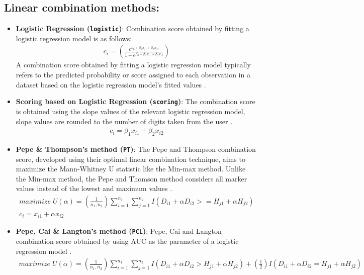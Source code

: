 \documentclass[10pt]{article}
\begin{document}
\subsection{Linear combination methods:}
\begin{itemize}
  \item \textbf{Logistic Regression (\texttt{logistic})}: Combination score obtained by fitting a logistic regression model is as follows:
    \begin{gather*} 
    c_i = \left(\frac{e^ {\beta_0 + \beta_1 x_{i1} + \beta_2 x_{i2}}}{1 + e^{\beta_0 + \beta_1 x_{i1} + \beta_2 x_{i2}}}\right)
    \end{gather*}
A combination score obtained by fitting a logistic regression model typically refers to the predicted probability or score assigned to each observation in a dataset based on the logistic regression model's fitted values \citep{walker1967estimation}.
  \item \textbf{Scoring based on Logistic Regression (\texttt{scoring})}: The combination score is obtained using the slope values of the relevant logistic regression model, slope values are rounded to the number of digits taken from the user \citep{leon2006bedside}.
    \begin{gather*} 
    c_i = \beta_1 x_{i1} + \beta_2 x_{i2}
    \end{gather*}
      \item \textbf{Pepe \& Thompson's method (\texttt{PT})}: The Pepe and Thompson combination score, developed using their optimal linear combination technique, aims to maximize the Mann-Whitney U statistic like the Min-max method. Unlike the Min-max method, the Pepe and Thomson method considers all marker values instead of the lowest and maximum values \citep{pepe2000combining}.
    \begin{gather*} 
    maximize\; U(\alpha) = \left(\frac{1}{n_1,n_2}\right) {\sum_{i=1}^{n_1} {\sum_{j=1}^{n_2}}I(D_{i1} + \alpha D_{i2} >= H_{j1} + \alpha H_{j2})} \\
    c_i = x_{i1} + \alpha x_{i2}
    \end{gather*}
    \item \textbf{Pepe, Cai \& Langton's method (\texttt{PCL})}: Pepe, Cai and Langton combination score obtained by using AUC as the parameter of a logistic regression model \citep{pepe2006combining}.
    \begin{gather*} 
    maximize\; U(\alpha) = \left(\frac{1}{n_1,n_2}\right) {\sum_{i=1}^{n_1} {\sum_{j=1}^{n_2}}I(D_{i1} + \alpha D_{i2} > H_{j1} + \alpha H_{j2}) + \left(\frac{1}{2} \right) I(D_{i1} + \alpha D_{i2} = H_{j1} + \alpha H_{j2})} \\

\end{gather*}
\end{itemize}
\end{document}
